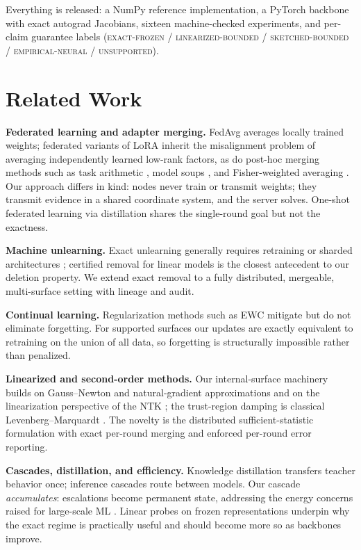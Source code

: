 \documentclass[11pt]{article}
\begin{document}
Everything is released: a NumPy reference implementation, a PyTorch
backbone with exact autograd Jacobians, sixteen machine-checked
experiments, and per-claim guarantee labels
(\textsc{exact-frozen} / \textsc{linearized-bounded} /
\textsc{sketched-bounded} / \textsc{empirical-neural} /
\textsc{unsupported}).

\section{Related Work}

\textbf{Federated learning and adapter merging.} FedAvg
\citep{mcmahan2017} averages locally trained weights; federated variants
of LoRA \citep{hu2022lora} inherit the misalignment problem of averaging
independently learned low-rank factors, as do post-hoc merging methods
such as task arithmetic \citep{ilharco2023}, model soups
\citep{wortsman2022}, and Fisher-weighted averaging
\citep{matena2022}. Our approach differs in kind: nodes never train or
transmit weights; they transmit evidence in a shared coordinate system,
and the server solves. One-shot federated learning via distillation
\citep{guha2019} shares the single-round goal but not the exactness.

\textbf{Machine unlearning.} Exact unlearning generally requires
retraining or sharded architectures \citep{bourtoule2021}; certified
removal for linear models \citep{guo2020} is the closest antecedent to
our deletion property. We extend exact removal to a fully distributed,
mergeable, multi-surface setting with lineage and audit.

\textbf{Continual learning.} Regularization methods such as EWC
\citep{kirkpatrick2017} mitigate but do not eliminate forgetting. For
supported surfaces our updates are exactly equivalent to retraining on
the union of all data, so forgetting is structurally impossible rather
than penalized.

\textbf{Linearized and second-order methods.} Our internal-surface
machinery builds on Gauss--Newton and natural-gradient approximations
\citep{martens2015} and on the linearization perspective of the NTK
\citep{jacot2018}; the trust-region damping is classical
Levenberg--Marquardt \citep{marquardt1963}. The novelty is the
distributed sufficient-statistic formulation with exact per-round
merging and enforced per-round error reporting.

\textbf{Cascades, distillation, and efficiency.} Knowledge distillation
\citep{hinton2015} transfers teacher behavior once; inference cascades
route between models. Our cascade \emph{accumulates}: escalations become
permanent state, addressing the energy concerns raised for large-scale
ML \citep{strubell2019,schwartz2020,patterson2021}. Linear probes on
frozen representations \citep{alain2017} underpin why the exact regime
is practically useful and should become more so as backbones improve.
\end{document}
